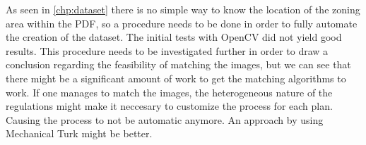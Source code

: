 As seen in \autoref{chp:dataset} there is no simple way to know the location of the zoning area within the PDF, so a procedure needs to be done in order to fully automate the creation of the dataset. The initial tests with OpenCV did not yield good results. This procedure needs to be investigated further in order to draw a conclusion regarding the feasibility of matching the images, but we can see that there might be a significant amount of work to get the matching algorithms to work. If one manages to match the images, the heterogeneous nature of the regulations might make it neccesary to customize the process for each plan. Causing the process to not be automatic anymore. An approach by using Mechanical Turk might be better.


